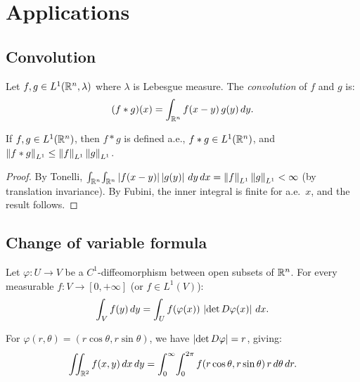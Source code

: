 \section{Applications}

\subsection{Convolution}

\begin{definition}[Convolution]
Let $f, g \in L^1(\mathbb{R}^n, \lambda)$ where $\lambda$ is Lebesgue measure. The
\emph{convolution} of $f$ and $g$ is:
\[
    (f * g)(x) = \int_{\mathbb{R}^n} f(x - y)\, g(y)\, dy.
\]
\end{definition}

\begin{proposition}
If $f, g \in L^1(\mathbb{R}^n)$, then $f * g$ is defined a.e., $f * g \in L^1(\mathbb{R}^n)$, and
$\left\| f * g \right\|_{L^1} \leq \left\| f \right\|_{L^1} \left\| g \right\|_{L^1}$.
\end{proposition}

\begin{proof}
By Tonelli, $\int_{\mathbb{R}^n}\!\int_{\mathbb{R}^n} \left| f(x-y) \right| \left| g(y) \right|\, dy\, dx
= \left\| f \right\|_{L^1} \left\| g \right\|_{L^1} < \infty$ (by translation invariance).
By Fubini, the inner integral is finite for a.e.\ $x$, and the result follows.
\end{proof}

\subsection{Change of variable formula}

\begin{theorem}
Let $\varphi : U \to V$ be a $C^1$-diffeomorphism between open subsets of $\mathbb{R}^n$.
For every measurable $f : V \to [0, +\infty]$ (or $f \in L^1(V)$):
\[
    \int_V f(y)\, dy = \int_U f(\varphi(x))\, \left| \det D\varphi(x) \right|\, dx.
\]
\end{theorem}

\begin{example}
For $\varphi(r, \theta) = (r\cos\theta, r\sin\theta)$, we have
$\left| \det D\varphi \right| = r$, giving:
\[
    \iint_{\mathbb{R}^2} f(x,y)\, dx\, dy
    = \int_0^{\infty}\!\int_0^{2\pi} f(r\cos\theta, r\sin\theta)\, r\, d\theta\, dr.
\]
\end{example}

